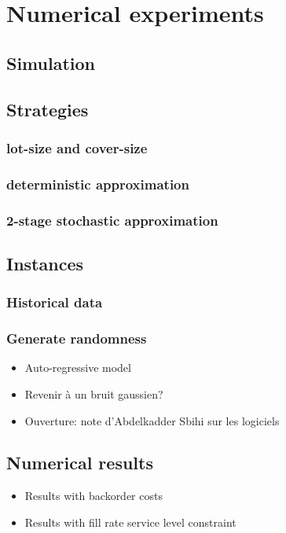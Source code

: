 \chapter{Numerical experiments}
\label{chap:PDP - Numerical experiments}



\section{Simulation}



\section{Strategies}

\subsection{lot-size and cover-size}
\subsection{deterministic approximation}
\subsection{2-stage stochastic approximation}




\section{Instances}

\subsection{Historical data}

\subsection{Generate randomness}

\begin{itemize}
  \item Auto-regressive model
  \item Revenir à un bruit gaussien?
  \item Ouverture: note d'Abdelkadder Sbihi sur les logiciels
\end{itemize}


\section{Numerical results}

\begin{itemize}
  \item Results with backorder costs
  \item Results with fill rate service level constraint
\end{itemize}
